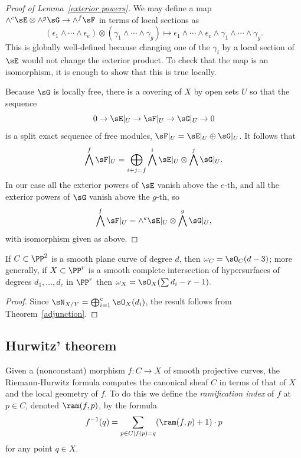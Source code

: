 \begin{proof}[Proof of Lemma~\ref{exterior powers}]
 We may define a map
$
\wedge^e\sE \otimes \wedge^g \sG \to \wedge^f\sF
$
in terms of local sections as
$$
(\epsilon_1\wedge\cdots \wedge \epsilon_e) \otimes (\gamma_1\wedge\cdots\wedge \gamma_g)
\mapsto \epsilon_1\wedge\cdots \wedge \epsilon_e\wedge\gamma_1\wedge\cdots\wedge \gamma_g.
$$
This is globally well-defined because changing one of the $\gamma_i$ by a local section of $\sE$ would not
change the exterior product.
To check that the map is an isomorphism, it is enough to show that this is true locally.

Because $\sG$ is locally free, there is a covering of $X$ by open sets $U$
so that the sequence
$$
0\to \sE|_U \to \sF|_U\to \sG|_U \to 0
$$
is a split exact sequence of free modules, $\sF|_U = \sE|_U\oplus \sG|_U$.
It follows that
$$
\bigwedge^f\sF|_U = \bigoplus_{i+j = f} \bigwedge^i \sE|_U \otimes \bigwedge^j\sG|_U.
$$
In our case all the exterior powers of $\sE$ vanish above the $e$-th, and all the 
exterior powers of $\sG$ vanish above the $g$-th, so 
$$
\bigwedge^f\sF|_U =  \wedge^e \sE|_U \otimes \bigwedge^g\sG|_U,
$$
with isomorphism given as above.
\end{proof}


\begin{corollary}\label{canonical of plane curve}\label{canonical of complete intersection}
If $C\subset \PP^{2}$ is a smooth plane curve of degree $d$, then $\omega_{C} = \sO_{C}(d-3)$; more generally, if
$X\subset \PP^{r}$ is a smooth complete intersection of hypersurfaces of degrees $d_{1},\dots, d_{c}$ in $\PP^r$ then
$\omega_{X} = \sO_{X}(\sum d_{i }-r-1).$
\end{corollary}

\begin{proof}
Since $\sN_{X/Y} = \bigoplus_{i=1}^{c} \sO_{X}(d_{i})$, the result follows from Theorem~\ref{adjunction}.
\end{proof}

\subsection{Hurwitz' theorem}
 Given a (nonconstant) morphism $f : C \to X$ of smooth projective curves, the Riemann-Hurwitz formula computes the canonical sheaf  $C$ in terms of that of  $X$ and the local geometry of $f$. To do this we define the
\emph{ramification index} of $f$ at $p \in C$,  denoted $\ram(f,p)$, 
by the formula 
$$
 f^{-1}(q) = \sum_{p\in C \mid f(p)=q} (\ram(f,p)+1)\cdot p
 $$
 for any point $q \in X$. 


